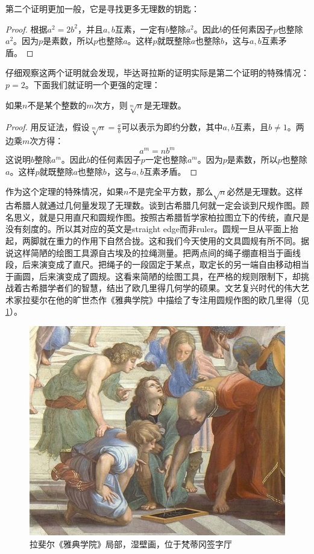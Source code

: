 \documentclass[b5paper]{ctexart}
\begin{document}
第二个证明更加一般，它是寻找更多无理数的钥匙：
\begin{proof}
根据$a^2 = 2b^2$，并且$a, b$互素，一定有$b$整除$a^2$。因此$b$的任何素因子$p$也整除$a^2$。因为$p$是素数，所以$p$也整除$a$。这样$p$就既整除$a$也整除$b$，这与$a, b$互素矛盾。
\end{proof}

仔细观察这两个证明就会发现，毕达哥拉斯的证明实际是第二个证明的特殊情况：$p = 2$。下面我们就证明一个更强的定理：

\begin{theorem}
如果$n$不是某个整数的$m$次方，则$\sqrt[m]{n}$是无理数。
\end{theorem}

\begin{proof}
用反证法，假设$\sqrt[m]{n} = \frac{a}{b}$可以表示为即约分数，其中$a, b$互素，且$b \ne 1$。两边乘$m$次方得：
\[
a^m = n b^m
\]
这说明$b$整除$a^m$。因此$b$的任何素因子$p$一定也整除$a^m$。因为$p$是素数，所以$p$也整除$a$。这样$p$就既整除$a$也整除$b$，这与$a, b$互素矛盾。
\end{proof}

作为这个定理的特殊情况，如果$n$不是完全平方数，那么$\sqrt{n}$必然是无理数。这样古希腊人就通过几何量发现了无理数。谈到古希腊几何就一定会谈到尺规作图。顾名思义，就是只用直尺和圆规作图。按照古希腊哲学家柏拉图立下的传统，直尺是没有刻度的。所以其对应的英文是straight edge而非ruler。圆规一旦从平面上抬起，两脚就在重力的作用下自然合拢。这和我们今天使用的文具圆规有所不同。据说这样简陋的绘图工具源自古埃及的拉绳测量。把两点间的绳子绷直相当于画线段，后来演变成了直尺。把绳子的一段固定于某点，取定长的另一端自由移动相当于画圆，后来演变成了圆规。这看来简陋的绘图工具，在严格的规则限制下，却挑战着古希腊学者们的智慧，结出了欧几里得几何学的硕果。文艺复兴时代的伟大艺术家拉斐尔在他的旷世杰作《雅典学院》中描绘了专注用圆规作图的欧几里得（见\cref{fig:euclid-soa}）。

\begin{figure}[htbp]
 \centering
 \includegraphics[scale=0.35]{img/euclid-soa}
 \caption{拉斐尔《雅典学院》局部，湿壁画，位于梵蒂冈签字厅}
 \label{fig:euclid-soa}
\end{figure}
\end{document}
